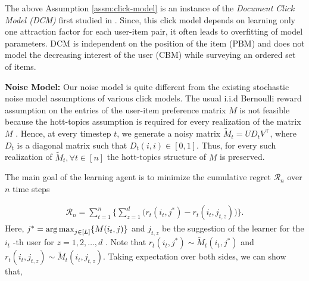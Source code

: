 \begin{discussion}
The above Assumption \ref{assm:click-model} is an instance of the \textit{Document Click Model (DCM)} first studied in \citet{craswell2008experimental}. Since, this click model depends on learning only one attraction factor for each user-item pair, it often leads to overfitting of model parameters. DCM is independent on the position of the item (PBM) and does not model the decreasing interest of the user (CBM) while surveying an ordered set of  items. 
\end{discussion}


\textbf{Noise Model:} Our noise model is quite different from the existing stochastic noise model assumptions of various click models. The usual i.i.d Bernoulli reward assumption on the entries of the user-item preference matrix $M$ is not feasible because the hott-topics assumption is required for every realization of the matrix $M$ . Hence,  at every timestep $t$, we generate a noisy matrix $\tilde{M}_t = UD_t V^{\intercal}$, where $D_t$ is a diagonal matrix such that $D_t(i,i)\in[0,1]$. Thus, for every such realization of $\tilde{M}_t, \forall t\in [n]$  the hott-topics structure of $M$ is preserved.

The main goal of the learning agent is to minimize the cumulative regret $\mathcal{R}_n$  over $n$ time steps

\begin{align*}
\mathcal{R}_n = \sum_{t=1}^{n}\bigg\lbrace \sum_{z=1}^{d} \bigg( r_{t}\left(i_{t}, j^* \right) - r_{t}\left( i_{t}, j_{t,z}\right)\bigg)\bigg\rbrace.
\end{align*}
Here, $j^* = \mathop{\rm arg\,max}_{j\in [L]}\lbrace M(i_t,j)\rbrace$  and $j_{t,z}$ be the suggestion of the learner for the $i_t$ -th user for  $z=1,2,\ldots, d$ . Note that $r_{t}\left(i_t, j^* \right)\sim \tilde{M}_t\left(i_t, j^*\right)$ and $r_{t}\left(i_t, j_{t,z} \right)\sim \tilde{M}_t\left(i_t, j_{t,z} \right)$. Taking expectation over both sides, we can show that,

